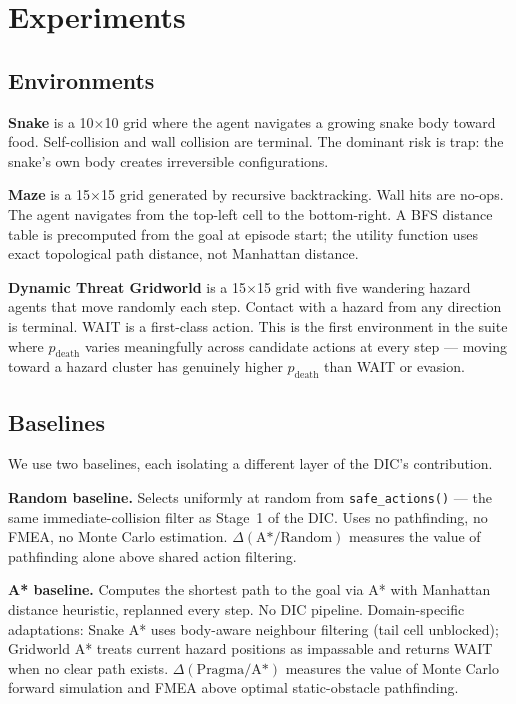\documentclass[11pt,letterpaper]{article}
\begin{document}
\section{Experiments}
\label{sec:experiments}

\subsection{Environments}

\textbf{Snake} is a 10$\times$10 grid where the agent navigates a growing snake
body toward food. Self-collision and wall collision are terminal. The dominant
risk is trap: the snake's own body creates irreversible configurations.

\textbf{Maze} is a 15$\times$15 grid generated by recursive backtracking. Wall
hits are no-ops. The agent navigates from the top-left cell to the bottom-right.
A BFS distance table is precomputed from the goal at episode start; the utility
function uses exact topological path distance, not Manhattan distance.

\textbf{Dynamic Threat Gridworld} is a 15$\times$15 grid with five wandering
hazard agents that move randomly each step. Contact with a hazard from any
direction is terminal. WAIT is a first-class action. This is the first
environment in the suite where $p_{\mathrm{death}}$ varies meaningfully across
candidate actions at every step --- moving toward a hazard cluster has
genuinely higher $p_{\mathrm{death}}$ than WAIT or evasion.

\subsection{Baselines}

We use two baselines, each isolating a different layer of the DIC's contribution.

\textbf{Random baseline.} Selects uniformly at random from \texttt{safe\_actions()} ---
the same immediate-collision filter as Stage~1 of the DIC. Uses no pathfinding,
no FMEA, no Monte Carlo estimation. $\Delta(\text{A*}/\text{Random})$ measures the
value of pathfinding alone above shared action filtering.

\textbf{A* baseline.} Computes the shortest path to the goal via A* with Manhattan
distance heuristic, replanned every step. No DIC pipeline. Domain-specific
adaptations: Snake A* uses body-aware neighbour filtering (tail cell unblocked);
Gridworld A* treats current hazard positions as impassable and returns WAIT when
no clear path exists. $\Delta(\text{Pragma}/\text{A*})$ measures the value of
Monte Carlo forward simulation and FMEA above optimal static-obstacle pathfinding.
\end{document}
